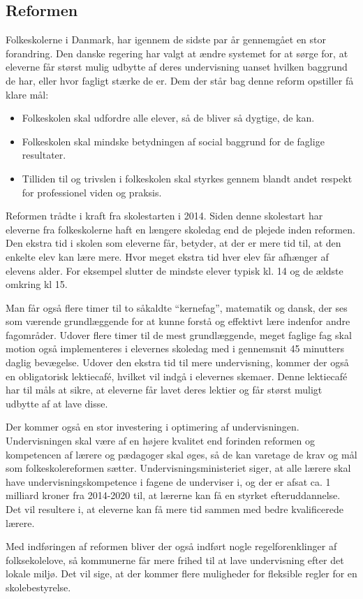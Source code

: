 \subsection{Reformen}
\label{Reformen}
Folkeskolerne i Danmark, har igennem de sidste par år gennemgået en stor forandring. Den danske regering har valgt at ændre systemet for at sørge for, at eleverne får størst mulig udbytte af deres undervisning uanset hvilken baggrund de har, eller hvor fagligt stærke de er.
Dem der står bag denne reform opstiller få klare mål\cite{reformenMaal}:
	\begin{itemize}
		\item Folkeskolen skal udfordre alle elever, så de bliver så dygtige, de kan.
		\item Folkeskolen skal mindske betydningen af social baggrund for de faglige resultater.
		\item Tilliden til og trivslen i folkeskolen skal styrkes gennem blandt andet respekt for professionel viden og praksis.
	\end{itemize}

Reformen trådte i kraft fra skolestarten i 2014. Siden denne skolestart har eleverne fra folkeskolerne haft en længere skoledag end de plejede inden reformen. Den ekstra tid i skolen som eleverne får, betyder, at der er mere tid til, at den enkelte elev kan lære mere. Hvor meget ekstra tid hver elev får afhænger af elevens alder. For eksempel slutter de mindste elever typisk kl. 14 og de ældste omkring kl 15.

Man får også flere timer til to såkaldte ``kernefag”, matematik og dansk, der ses som værende grundlæggende for at kunne forstå og effektivt lære indenfor andre fagområder. Udover flere timer til de mest grundlæggende, meget faglige fag skal motion også implementeres i elevernes skoledag med i gennemsnit 45 minutters daglig bevægelse\cite{reformenBorger}. Udover den ekstra tid til mere undervisning, kommer der også en obligatorisk lektiecafé, hvilket vil indgå i elevernes skemaer. Denne lektiecafé har til måls at sikre, at eleverne får lavet deres lektier og får størst muligt udbytte af at lave disse.

Der kommer også en stor investering i optimering af undervisningen. Undervisningen skal være af en højere kvalitet end forinden reformen og kompetencen af lærere og pædagoger skal øges, så de kan varetage de krav og mål som folkeskolereformen sætter. Undervisningsministeriet siger, at alle lærere skal have undervisningskompetence i fagene de underviser i, og der er afsat ca. 1 milliard kroner fra 2014-2020 til, at lærerne kan få en styrket efteruddannelse. Det vil resultere i, at eleverne kan få mere tid sammen med bedre kvalificerede lærere.

Med indføringen af reformen bliver der også indført nogle regelforenklinger af folksekolelove, så kommunerne får mere frihed til at lave undervisning efter det lokale miljø. Det vil sige, at der kommer flere muligheder for fleksible regler for en skolebestyrelse.
